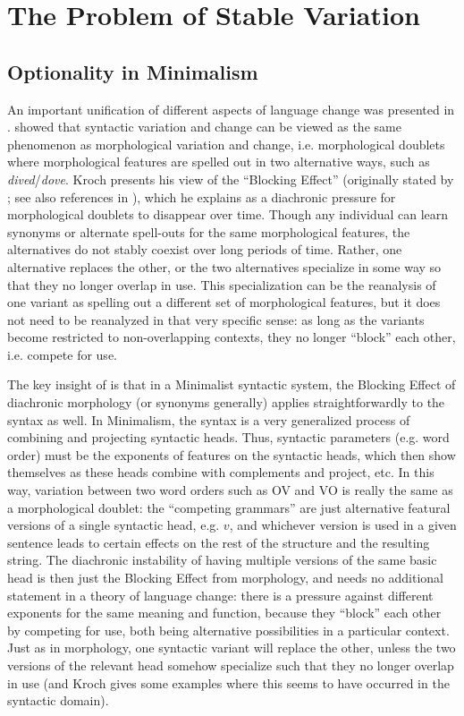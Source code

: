 \section{The Problem of Stable Variation}
\subsection{Optionality in Minimalism}

An important unification of different aspects of language change was presented in \citet{kroch1994}.
\citet{kroch1994} showed that syntactic variation and change can be viewed as the same phenomenon as morphological variation and change, i.e. morphological doublets where morphological features are spelled out in two alternative ways, such as \textsl{dived}/\textsl{dove}.
Kroch presents his view of the ``Blocking Effect'' (originally stated by \citealt{aronoff1976}; see also references in \citealt{kroch1994}), which he explains as a diachronic pressure for morphological doublets to disappear over time.
Though any individual can learn synonyms or alternate spell-outs for the same morphological features, the alternatives do not stably coexist over long periods of time.
Rather, one alternative replaces the other, or the two alternatives specialize in some way so that they no longer overlap in use.
This specialization can be the reanalysis of one variant as spelling out a different set of morphological features, but it does not need to be reanalyzed in that very specific sense: as long as the variants become restricted to non-overlapping contexts, they no longer ``block'' each other, i.e. compete for use.

The key insight of \citet{kroch1994} is that in a Minimalist syntactic system, the Blocking Effect of diachronic morphology (or synonyms generally) applies straightforwardly to the syntax as well.
In Minimalism, the syntax is a very generalized process of combining and projecting syntactic heads.
Thus, syntactic parameters (e.g. word order) must be the exponents of features on the syntactic heads, which then show themselves as these heads combine with complements and project, etc.
In this way, variation between two word orders such as OV and VO is really the same as a morphological doublet: the ``competing grammars'' \citep{kroch1989} are just alternative featural versions of a single syntactic head, e.g. $v$, and whichever version is used in a given sentence leads to certain effects on the rest of the structure and the resulting string.
The diachronic instability of having multiple versions of the same basic head is then just the Blocking Effect from morphology, and needs no additional statement in a theory of language change: there is a pressure against different exponents for the same meaning and function, because they ``block'' each other by competing for use, both being alternative possibilities in a particular context.
Just as in morphology, one syntactic variant will replace the other, unless the two versions of the relevant head somehow specialize such that they no longer overlap in use (and Kroch gives some examples where this seems to have occurred in the syntactic domain).

